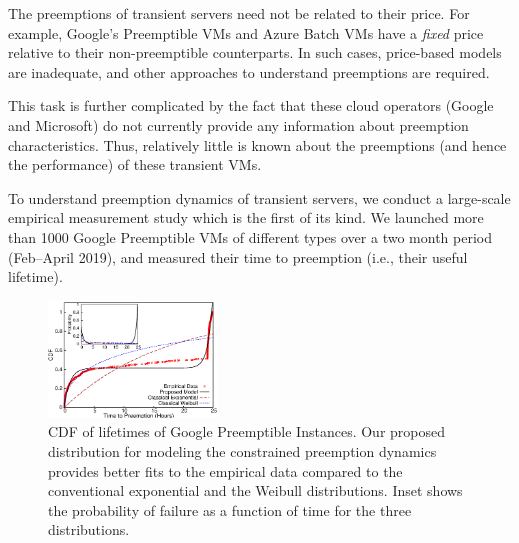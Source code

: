 The preemptions of transient servers need not be related to their price.
For example, Google's Preemptible VMs and Azure Batch VMs have a \emph{fixed} price relative to their non-preemptible counterparts. 
In such cases, price-based models are inadequate, and other approaches to understand preemptions are required.

This task is further complicated by the fact that these cloud operators (Google and Microsoft) do not currently provide any information about preemption characteristics. 
Thus, relatively little is known about the preemptions (and hence the performance) of these transient VMs. %

To understand preemption dynamics of transient servers, we conduct a large-scale empirical measurement study which is the first of its kind. 
We launched more than 1000 Google Preemptible VMs of different types over a two month period (Feb--April 2019), and measured their time to preemption (i.e., their useful lifetime).\footnotemark



\begin{figure}
  \centering
  \includegraphics[width=0.4\textwidth]{../graphs/scispot-fig-cdf-prob-inset-time.eps}
  \caption{CDF of lifetimes of Google Preemptible Instances. Our proposed distribution for modeling the constrained preemption dynamics provides better fits to the empirical data compared to the conventional exponential and the Weibull distributions. Inset shows the probability of failure as a function of time for the three distributions.}
  \label{fig:gcp1}
\end{figure}

